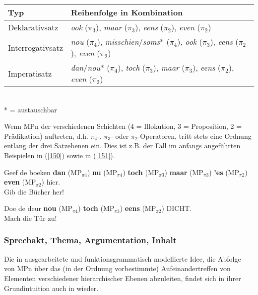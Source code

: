 \begin{exe}
	\ex\label{149}
	\scriptsize
	\begin{tabular}[t]{|l|l|}
	\hline
  	Typ & Reihenfolge in Kombination\\
  	\hline
  	Deklarativsatz & \textit{ook} ($\pi_{\textrm{3}}$), \textit{maar} ($\pi_{\textrm{3}}$), \textit{eens} ($\pi_{\textrm{2}}$), \textit{even} ($\pi_{\textrm{2}}$)\\
  	\hline
  	Interrogativsatz & \textit{nou} ($\pi_{\textrm{4}}$), \textit{misschien}/\textit{soms}* ($\pi_{\textrm{4}}$), \textit{ook} ($\pi_{\textrm{3}}$), \textit{eens} ($\pi_{\textrm{2}}$), 			\textit{even} ($\pi_{\textrm{2}}$)\\
  	\hline 
  	Imperatisatz & \textit{dan}/\textit{nou}* ($\pi_{\textrm{4}}$), \textit{toch} ($\pi_{\textrm{3}}$), \textit{maar} ($\pi_{\textrm{3}}$), \textit{eens} ($\pi_{\textrm{2}}$), \textit{even} ($\pi_{\textrm{2}}$)\\
  	\hline
\end{tabular}\\
* = austauschbar
\end{exe}
Wenn MPn der verschiedenen Schichten (4 = Illokution, 3 = Proposition, 2 = Prädikation) auftreten, d.h. $\pi_{\textrm{4}}$-, $\pi_{\textrm{3}}$- oder $\pi_{\textrm{2}}$-Operatoren, tritt stets eine Ordnung entlang der drei Satzebenen ein. Dies ist z.B. der Fall im anfangs angeführten Beispielen in (\ref{150}) sowie in (\ref{151}).

\begin{exe}
	\ex\label{150} 
	Geef de boeken \textbf{dan} ($\textrm{MP}_{\pi\textrm{4}}$) \textbf{nu} ($\textrm{MP}_{\pi\textrm{4}}$) \textbf{toch} ($\textrm{MP}_{\pi\textrm{3}}$) \textbf{maar} ($\textrm{MP}_{\pi\textrm{3}}$) \textbf{'es} ($\textrm{MP}_{\pi\textrm{2}}$) \textbf{even} ($\textrm{MP}_{\pi\textrm{2}}$) hier.\\
	Gib die Bücher her!
	\hbox{}\hfill\hbox{\citet[98]{Hoogvliet1903}}
\end{exe}

\begin{exe}
	\ex\label{151} 
	Doe de deur \textbf{nou} ($\textrm{MP}_{\pi\textrm{4}}$) \textbf{toch} ($\textrm{MP}_{\pi\textrm{3}}$) \textbf{eens} ($\textrm{MP}_{\pi\textrm{2}}$) DICHT.\\
	Mach die Tür zu!
	\hbox{}\hfill\hbox{\citet[163]{Vismans1994}}	
\end{exe}

\subsubsection{Sprechakt, Thema, Argumentation, Inhalt}
\label{sec:stai}
Die in \citet{Vismans1994} ausgearbeitete und funktionsgrammatisch modellierte Idee, die Abfolge von MPn über das (in der Ordnung vorbestimmte) Aufeinandertreffen von Elementen verschiedener hierarchischer Ebenen abzuleiten, findet sich in ihrer Grundintuition auch in \citet{Ickler1994} wieder. 

